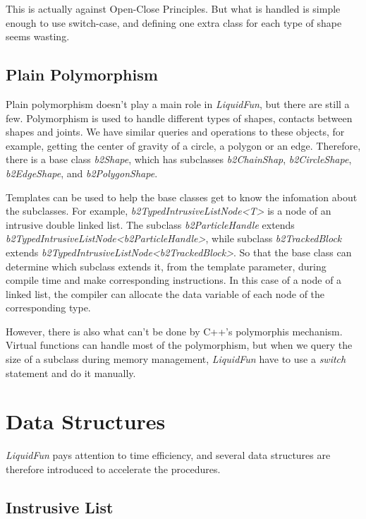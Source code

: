 \documentclass[UTF8]{ctexart}
\begin{document}
            This is actually against Open-Close Principles. But what is handled is simple enough to use switch-case, and defining one extra class for each type of shape seems wasting.

        \subsection{Plain Polymorphism}

            Plain polymorphism doesn't play a main role in \textit{LiquidFun}, but there are still a few. Polymorphism is used to handle different types of shapes, contacts between shapes and joints. We have similar queries and operations to these objects, for example, getting the center of gravity of a circle, a polygon or an edge. Therefore, there is a base class \textit{b2Shape}, which has subclasses \textit{b2ChainShap}, \textit{b2CircleShape}, \textit{b2EdgeShape}, and \textit{b2PolygonShape}.

            Templates can be used to help the base classes get to know the infomation about the subclasses. For example, \textit{b2TypedIntrusiveListNode<T>} is a node of an intrusive double linked list. The subclass \textit{b2ParticleHandle} extends \textit{b2TypedIntrusiveListNode<b2ParticleHandle>}, while subclass \textit{b2TrackedBlock} extends \textit{b2TypedIntrusiveListNode<b2TrackedBlock>}. So that the base class can determine which subclass extends it, from the template parameter, during compile time and make corresponding instructions. In this case of a node of a linked list, the compiler can allocate the data variable of each node of the corresponding type.

            However, there is also what can't be done by C++'s polymorphis mechanism. Virtual functions can handle most of the polymorphism, but when we query the size of a subclass during memory management, \textit{LiquidFun} have to use a \textit{switch} statement and do it manually.

    \section{Data Structures}

        \textit{LiquidFun} pays attention to time efficiency, and several data structures are therefore introduced to accelerate the procedures.

        \subsection{Instrusive List}
\end{document}
